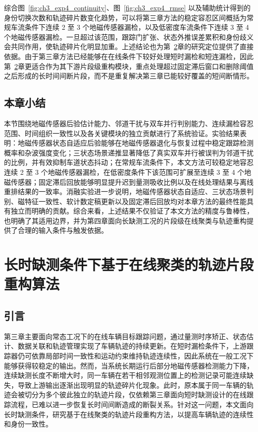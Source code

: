\documentclass{xdupgthesis}
\begin{document}
综合图~\ref{fig:ch3_exp4_continuity}、图~\ref{fig:ch3_exp4_rmse} 以及辅助统计得到的身份切换次数和轨迹碎片数变化趋势，可以将第三章方法的稳定容忍区间概括为常规车流条件下连续 2 至 3 个地磁传感器漏检，以及低密度车流条件下连续 3 至 4 个地磁传感器漏检。一旦超过该范围，跟踪门扩张、状态外推误差累积和身份歧义会共同作用，使轨迹碎片化明显加重。上述结论也为第~\ref{chap:cedas_fragment}章的研究定位提供了直接依据。由于第三章方法已经能够在在线条件下较好处理短时漏检和短连漏检，因此第~\ref{chap:cedas_fragment}章更适合作为其下游片段级重构模块，重点处理超过固定滞后窗口和删除阈值之后形成的长时间间断片段，而不是重复解决第三章已能较好覆盖的短间断情形。

\section{本章小结}


本节围绕地磁传感器后验估计能力、邻道干扰与双车并行判别能力、连续漏检容忍范围、时间组织一致性以及各关键模块的独立贡献进行了系统验证。实验结果表明：地磁传感器状态自适应后验能够在地磁传感器退化与恢复过程中稳定跟踪检测概率和杂波强度变化；三状态场景递推显著降低了真实双车并行被误判为邻道干扰的比例，并有效抑制车道状态抖动；在常规车流条件下，本文方法可较稳定地容忍连续 2 至 3 个地磁传感器漏检，在低密度条件下该范围可扩展至连续 3 至 4 个地磁传感器；固定滞后回放能够明显提升迟到量测吸收比例以及在线处理结果与离线重排结果的一致率。消融实验进一步说明，地磁传感器状态自适应、三状态场景判别、磁特征一致性、软计数定稿更新以及固定滞后回放均对本章方法的最终性能具有独立而明确的贡献。综合来看，上述结果不仅验证了本文方法的精度与鲁棒性，也明确了其适用边界，并为第四章面向长缺测工况的片段级在线聚类与轨迹重构提供了合理的输入条件与触发依据。


\chapter{长时缺测条件下基于在线聚类的轨迹片段重构算法}
\label{chap:cedas_fragment}

\graphicspath{
	{code/chapter4/experiment123/chapter4_results/exp1/}
	{code/chapter4/experiment123/chapter4_results/exp2/}
	{code/chapter4/experiment123/chapter4_results/exp3/}
}


\section{引言}

第三章主要面向常态工况下的在线车辆目标跟踪问题，通过量测时序矫正、状态估计、数据关联和轨迹管理实现了车辆轨迹的持续更新。在短时漏检条件下，上游跟踪器仍可依靠局部时间一致性和运动约束维持轨迹连续性，因此系统在一般工况下能够获得较稳定的输出。然而，当系统长期运行后部分地磁传感器检测能力下降，连续缺测长度不断增大时，同一车辆在若干相邻观测位置上的检测记录可能连续缺失，导致上游输出逐渐出现明显的轨迹碎片化现象。此时，原本属于同一车辆的轨迹会被切分为多个彼此独立的轨迹片段，仅依赖第三章面向短时缺测设计的在线跟踪流程，已难以进一步恢复长时间间断造成的断裂关系。针对这一问题，本文面向长时缺测条件，研究基于在线聚类的轨迹片段重构方法，以提高车辆轨迹的连续性和身份一致性。
\end{document}
